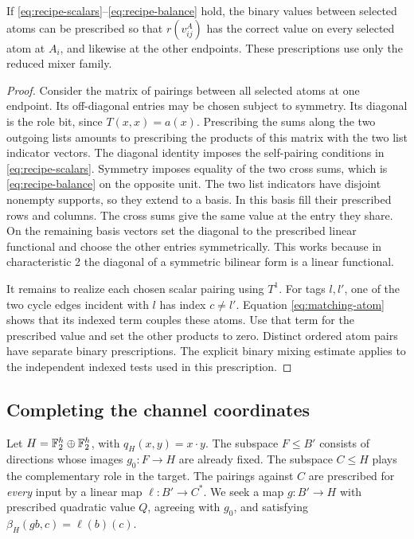 \begin{lemma}\label{lem:small-tables}
If \eqref{eq:recipe-scalars}--\eqref{eq:recipe-balance} hold, the binary
values between selected atoms can be prescribed so that
\(r(v^A_{ij})\) has the correct value on every selected atom at \(A_i\),
and likewise at the other endpoints. These prescriptions use only the
reduced mixer family.
\end{lemma}
\begin{proof}
Consider the matrix of pairings between all selected atoms at one endpoint.
Its off-diagonal entries may be chosen subject to symmetry. Its diagonal is the role bit,
since \(T(x,x)=a(x)\). Prescribing the sums along the two outgoing lists
amounts to prescribing the products of this matrix with the two list
indicator vectors. The diagonal identity imposes the self-pairing
conditions in \eqref{eq:recipe-scalars}. Symmetry imposes equality of the
two cross sums, which is \eqref{eq:recipe-balance} on the opposite unit.
The two list indicators have disjoint nonempty supports, so they extend
to a basis. In this basis fill their prescribed rows and columns.
The cross sums give the same value at the entry they share. On the
remaining basis vectors set the diagonal to the prescribed linear
functional and choose the other entries symmetrically. This works
because in characteristic 2 the diagonal of a symmetric bilinear
form is a linear functional.

It remains to realize each chosen scalar pairing using \(T^1\).
For tags \(l,l'\), one of the two cycle edges incident with \(l\) has
index \(c\ne l'\). Equation \eqref{eq:matching-atom} shows that its
indexed term couples these atoms. Use that term for the prescribed value
and set the other products to zero. Distinct ordered atom pairs have
separate binary prescriptions. The explicit binary mixing estimate applies
to the independent indexed tests used in this prescription.
\end{proof}

\subsection{Completing the channel coordinates}

Let \(H=\mathbb F_2^h\oplus\mathbb F_2^h\), with \(q_H(x,y)=x\cdot y\).
The subspace \(F\le B'\) consists of directions whose images
\(g_0:F\to H\) are already fixed. The subspace \(C\le H\) plays
the complementary role in the target. The pairings against \(C\)
are prescribed for \emph{every} input by a linear map
\(\ell:B'\to C^*\).
We seek a map \(g:B'\to H\) with prescribed quadratic value \(Q\),
agreeing with \(g_0\), and satisfying
\(\beta_H(gb,c)=\ell(b)(c)\).

